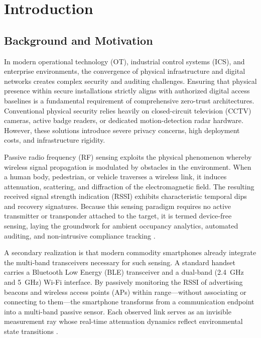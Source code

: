 \documentclass[journal,10pt]{IEEEtran}
\begin{document}
\section{Introduction}
\subsection{Background and Motivation}
In modern operational technology (OT), industrial control systems (ICS), and enterprise environments, the convergence of physical infrastructure and digital networks creates complex security and auditing challenges. Ensuring that physical presence within secure installations strictly aligns with authorized digital access baselines is a fundamental requirement of comprehensive zero-trust architectures. Conventional physical security relies heavily on closed-circuit television (CCTV) cameras, active badge readers, or dedicated motion-detection radar hardware. However, these solutions introduce severe privacy concerns, high deployment costs, and infrastructure rigidity. 

Passive radio frequency (RF) sensing exploits the physical phenomenon whereby wireless signal propagation is modulated by obstacles in the environment. When a human body, pedestrian, or vehicle traverses a wireless link, it induces attenuation, scattering, and diffraction of the electromagnetic field. The resulting received signal strength indication (RSSI) exhibits characteristic temporal dips and recovery signatures. Because this sensing paradigm requires no active transmitter or transponder attached to the target, it is termed device-free sensing, laying the groundwork for ambient occupancy analytics, automated auditing, and non-intrusive compliance tracking \cite{wilson2010}.

A secondary realization is that modern commodity smartphones already integrate the multi-band transceivers necessary for such sensing. A standard handset carries a Bluetooth Low Energy (BLE) transceiver and a dual-band (2.4~GHz and 5~GHz) Wi-Fi interface. By passively monitoring the RSSI of advertising beacons and wireless access points (APs) within range---without associating or connecting to them---the smartphone transforms from a communication endpoint into a multi-band passive sensor. Each observed link serves as an invisible measurement ray whose real-time attenuation dynamics reflect environmental state transitions \cite{ramirez2021,milano2024,bai2020}.
\end{document}

